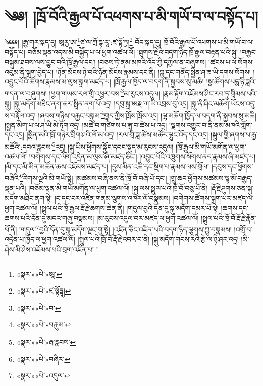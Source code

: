 \chapter{༄༅། །ཁྲོ་བོའི་རྒྱལ་པོ་འཕགས་པ་མི་གཡོ་བ་ལ་བསྟོད་པ།}༄༅༅། །རྒྱ་གར་སྐད་དུ། ཨཱརྱ་ཨ་\footnote{«སྣར་»«པེ་»ཨཱ་}ཙ་ལ་ཀྲོ་དྷ་རཱ་:ཛ་སྟོ་ཏྲ།\footnote{«སྣར་»«པེ་»ཛ་སྟོཏྟཱ།} བོད་སྐད་དུ། ཁྲོ་བོའི་རྒྱལ་པོ་འཕགས་པ་མི་གཡོ་བ་ལ་བསྟོད་པ། བཅོམ་ལྡན་འདས་མི་བསྐྱོད་པ་ལ་ཕྱག་འཚལ་ལོ། །ཐུགས་རྗེའི་བདག་ཉིད་ཁྲོ་རྒྱལ་བརྟན་པའི་སྐུ། །བརྐྱང་བསྐུམ་ཐབས་ལས་བྱུང་བའི་ཁྲོ་རྒྱལ་དང་། །བཅས་ཏེ་ནམ་མཁའི་འོད་ཀྱི་དཀྱིལ་ན་བཞུགས། །ཚངས་པ་ལ་སོགས་འབུམ་ནི་སྐྲག་བྱེད་པ། །ཉོན་མོངས་ཉེ་བའི་ཉོན་མོངས་རྣམས་དང་ནི། །ཀླུ་དང་གནོད་སྦྱིན་ཤ་ཟ་ཡི་དགས་སོགས། །འབྱུང་པོའི་ཚོགས་རྣམས་མ་ལུས་སྐྲག་མཛད་པ། །ཁྲོ་རྒྱལ་ཁྱོད་ལ་བདག་ནི་སྐྱབས་སུ་མཆི། །སྣ་ཚོགས་པདྨ་ཉི་ཟླའི་གདན་ལ་བཞུགས། །ཕྱག་གཡས་རལ་གྲི་འཕྱར་བས་\footnote{«སྣར་»«པེ་»བ་}མ་རུངས་འདུལ། །རྣམ་རྟོག་འཇོམས་ཤིང་རབ་ཏུ་གྲིམས་པའི་སྐུ། །སྐུ་མདོག་མཐིང་ནག་ཆར་སྤྲིན་ནག་པོ་འདྲ། །དབུ་སྐྲ་ཨརྫ་ཀ་ཡི་འབྲས་བུ་འདྲ། །སྐུ་ནི་ཤིང་མཆོག་ཡོངས་འདུ་ས་བརྟོལ་འདྲ། །ཞབས་གཉིས་བརྐྱང་བསྐུམ་\footnote{«སྣར་»«པེ་»བརྐུམ་}གྱད་ཀྱིས་ཁྲོས་ཁྲོས་འདྲ། །ལྷ་མཆོག་ཁྱོད་ལ་བདག་ནི་སྐྱབས་སུ་མཆི། །སྤྱན་མིག་པ་ལ་ཤ་ཡི་མེ་ཏོག་འདྲ། །མཆེ་བ་གཙིགས་པ་ཟླ་བ་ཚེས་པ་འདྲ། །ལྗགས་འགྱུར་བ་ནི་ནམ་མཁའི་གློག་དང་འདྲ། །སྨིན་མའི་ཁྲོ་གཉེར་བྲིག་ཤའི་ལོ་མ་འདྲ། །རལ་གྲི་ཟླ་ཚེས་མཚོར་ལྷུང་འོད་དང་འདྲ། །སྦྲུལ་གྱི་ཞགས་པ་རྒྱ་མཚོའི་:དབའ་རླབས་\footnote{«སྣར་»«པེ་»རྦ་རླབས་}འདྲ། །སྐུ་ཡིས་ཕྱོགས་སྐྱོང་དབང་སྡུད་མ་རུངས་འདུལ། །ཁྲོ་རྒྱལ་མི་གཡོ་མགོན་ལ་ཕྱག་འཚལ་ལོ། །བགེགས་དང་ལོག་འདྲེན་མ་ལུས་ཞི་མཛད་ཅིང་། །འབྱུང་པོའི་འཁྲུགས་སོགས་ནད་རྣམས་ཞི་མཛད་པ། །མི་དང་མི་མིན་མཚོན་ཆས་འཇོམས་མཛད་པ། །དུས་མིན་འཆི་དང་སྡིག་པ་རྣམས་ལས་གྲོལ། །དབུས་དང་ཕྱོགས་བཞིའི་\footnote{«སྣར་»«པེ་»བཞིར་}རིགས་ལྔའི་མི་གཡོ་སྟེ། །མཚམས་བཞི་ནས་ནི་ཁྲོ་བོ་བཞི་པོ་དང་། །གྲུ་ཆད་ཕྱོགས་མཚམས་ལྷ་མོ་བརྒྱད་ལྡན་པའི། །བཅོམ་ལྡན་མི་གཡོ་མགོན་ལ་ཕྱག་འཚལ་ལོ། །སྐུ་ལས་སྤྲུལ་པའི་ཁྲོ་བོ་བཅུ་པོ་ནི། །རྡོ་རྗེ་ཤུགས་ཅན་སྐུ་མདོག་མཐིང་ནག་སྟེ། །ང་དང་ངར་འཛིན་གནམ་ལྕགས་འཁོར་ལོ་བསྣམས། །བགེགས་ཚོགས་སྐྲག་པར་མཛད་ལ་ཕྱག་འཚལ་ལོ། །སྤྲུལ་པའི་ཁྲོ་རྒྱལ་རྡོ་རྗེ་ཆགས་ཆེན་ནི། །གདུལ་བྱའི་དོན་དུ་སྐུ་མདོག་དམར་པོ་སྟེ། །ཆགས་དང་ཆགས་པའི་དོན་དུ་མདའ་གཞུ་བསྣམས། །མ་རུངས་འདུལ་བར་མཛད་ལ་ཕྱག་འཚལ་ལོ། །སྤྲུལ་པའི་ཁྲོ་བོ་རྡོ་རྗེ་རྣོན་པོ་ནི། །གདུལ་\footnote{«སྣར་»«པེ་»འདུལ་}བྱའི་དོན་དུ་སྐུ་མདོག་ལྗང་གུ་སྟེ། །འཛིན་ཅིང་འཛིན་པའི་བདག་ཉིད་ལྕགས་ཀྱུ་བསྣམས། །འགྲོ་བ་འདྲེན་པ་ཁྱོད་ལ་ཕྱག་འཚལ་ལོ། །སྤྲུལ་པའི་ཁྲོ་བོ་རྡོ་རྗེ་འབར་བ་ནི། །སྐུ་མདོག་གངས་རིའི་རྩེ་ལ་ཉི་ཤར་འདྲ། །མི་ཤེས་མི་ཤེས་འཇོམས་པའི་བྲག་འཛིན་པ། །
